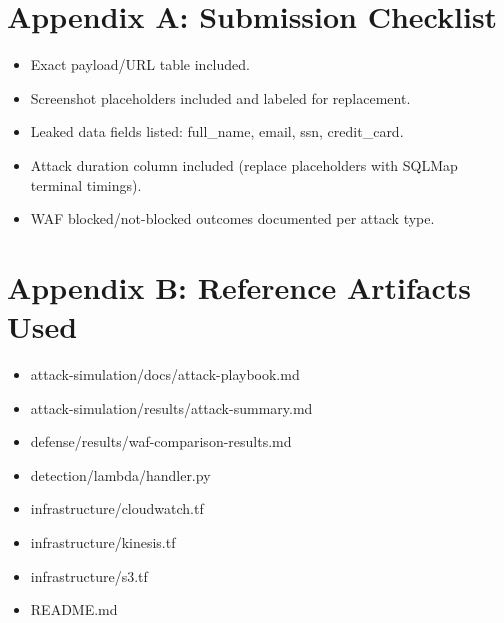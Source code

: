 \documentclass[12pt,a4paper]{article}
\begin{document}
\section*{Appendix A: Submission Checklist}
\begin{itemize}
  \item Exact payload/URL table included.
  \item Screenshot placeholders included and labeled for replacement.
  \item Leaked data fields listed: full\_name, email, ssn, credit\_card.
  \item Attack duration column included (replace placeholders with SQLMap terminal timings).
  \item WAF blocked/not-blocked outcomes documented per attack type.
\end{itemize}

\section*{Appendix B: Reference Artifacts Used}
\begin{itemize}
  \item attack-simulation/docs/attack-playbook.md
  \item attack-simulation/results/attack-summary.md
  \item defense/results/waf-comparison-results.md
  \item detection/lambda/handler.py
  \item infrastructure/cloudwatch.tf
  \item infrastructure/kinesis.tf
  \item infrastructure/s3.tf
  \item README.md
\end{itemize}
\end{document}
